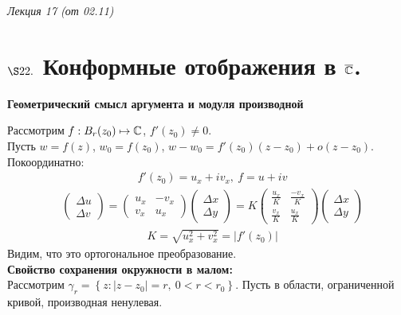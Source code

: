 \begin{flushright}
    \textit{Лекция 17 (от 02.11)}
\end{flushright}
\section{$\S 22.$ Конформные отображения в $\overline{\mathbb{C}}$.}
\begin{center}
    \textbf{Геометрический смысл аргумента и модуля производной}
\end{center}
Рассмотрим $f: B_r(z_0) \mapsto \mathbb{C}$, $f'(z_0) \neq 0$.
\\
Пусть $w = f(z)$, $w_0 = f(z_0)$, $w-w_0 = f'(z_0)(z-z_0) + o(z-z_0)$.
\\
Покоординатно:
\begin{align*}
  & f'(z_0) = u_x+iv_x, \ f=u+iv
\end{align*}
\begin{align*}
  & \left( \begin{matrix}
          \Delta u \\
          \Delta v
      \end{matrix} \right) = \left( \begin{matrix}
          u_x & -v_x \\
          v_x & u_x
      \end{matrix} \right)  \left( \begin{matrix}
          \Delta x \\
          \Delta y
      \end{matrix} \right) = K \left( \begin{matrix}
          \frac{u_x}{K} & \frac{-v_x}{K} \\
          \frac{v_x}{K} & \frac{u_x}{K}
      \end{matrix} \right) \left( \begin{matrix}
          \Delta x \\
          \Delta y
      \end{matrix} \right)
\end{align*}
\begin{align*}
  & K = \sqrt{u^2_x+v^2_x} = \left| f'(z_0) \right|
\end{align*}
Видим, что это ортогональное преобразование.
\\
\textbf{Свойство сохранения окружности в малом:}
\\
Рассмотрим $\gamma_r = \left\{ z: \left| z-z_0 \right| = r, \ 0 < r <
    r_0\right\}$. Пусть в области, ограниченной кривой, производная ненулевая.
